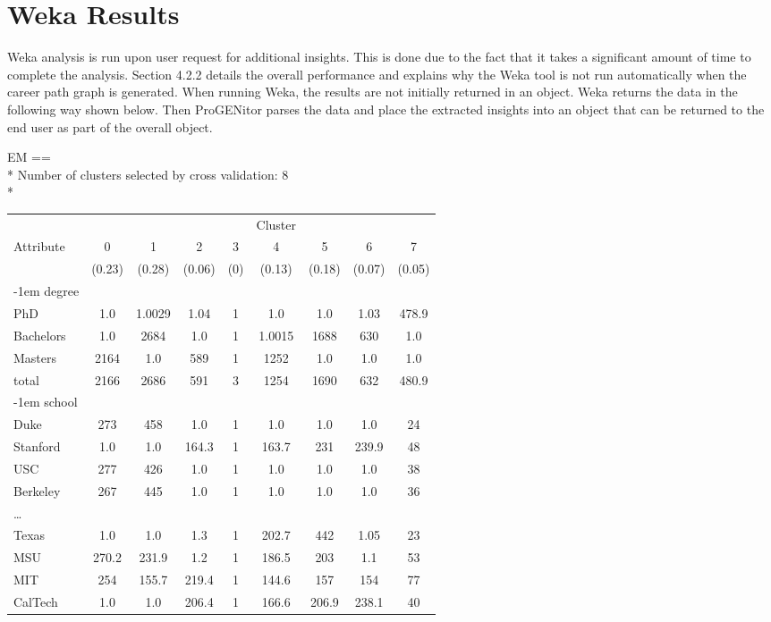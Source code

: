 \section{Weka Results}
\label{sect:weka-results}
Weka analysis is run upon user request for additional insights.  This is
done due to the fact that it takes a significant amount of time to complete
the analysis.  Section 4.2.2 details the overall performance and explains
why the Weka tool is not run automatically when the career path graph is
generated.  When running Weka, the results are not initially returned in an
object.  Weka returns the data in the following way shown below.  Then
ProGENitor parses the data and place the extracted insights into an object that
can be returned to the end user as part of the overall object.

\pagebreak 
\begin{tt}
\begin{footnotesize}
\noindent EM
\noindent ==\\*
\noindent Number of clusters selected by cross validation: 8\\*                           
\begin{tabular}{lcccccccc} 
&&&&&Cluster\\
Attribute&0&1&2&3&4&5&6&7\\
&(0.23)&(0.28)&(0.06)&(0)&(0.13)&(0.18)&(0.07)&(0.05)\\
\kern-1em degree\\
PhD&1.0&1.0029&1.04&1&1.0&1.0&1.03&478.9\\
Bachelors&1.0&2684&1.0&1&1.0015&1688&630&1.0\\
Masters&2164&1.0&589&1&1252&1.0&1.0&1.0\\
total&2166&2686&591&3&1254&1690&632&480.9\\
\kern-1em school\\
Duke&273&458&1.0&1&1.0&1.0&1.0&24\\
Stanford&1.0&1.0&164.3&1&163.7&231&239.9&48\\
USC&277&426&1.0&1&1.0&1.0&1.0&38\\
Berkeley&267&445&1.0&1&1.0&1.0&1.0&36\\
\ldots&&&&&&&&\\
Texas&1.0&1.0&1.3&1&202.7&442&1.05&23\\ 
MSU&270.2&231.9&1.2&1&186.5&203&1.1&53\\
MIT&254&155.7&219.4&1&144.6&157&154&77\\
CalTech&1.0&1.0&206.4&1&166.6&206.9&238.1&40\\ 

\end{tabular}
\end{footnotesize}
\end{tt}
